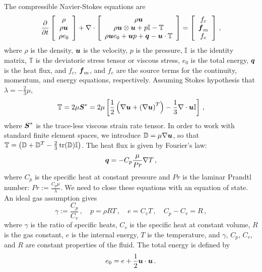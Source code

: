 \documentclass[Dissertation.tex]{subfiles}
\begin{document}
The compressible Navier-Stokes equations are
\begin{align}
\frac{\partial}{\partial t}\left[ \begin{array}{c} \rho\\ \rho\boldsymbol u\\ \rho e_0\\ \end{array} \right]
+\nabla\cdot\left[ \begin{array}{c} \rho\boldsymbol u\\ \rho\boldsymbol u\otimes\boldsymbol u+p\mathbb{I}-\mathbb{T}\\ \rho\boldsymbol u e_0+\boldsymbol u p+\boldsymbol q-\boldsymbol u\cdot\mathbb{T}\\ \end{array} \right]
=\left[ \begin{array}{c} f_c\\ \boldsymbol f_m\\ f_e\\ \end{array} \right]\,,
\end{align}
where $\rho$ is the density, $\boldsymbol u$ is the velocity, $p$ is the pressure, $\mathbb{I}$ is the identity matrix,
$\mathbb{T}$ is the deviatoric stress tensor or viscous stress, $e_0$ is the total energy, $\boldsymbol q$ is the heat flux, 
and $f_c$, $\boldsymbol f_m$, and $f_e$ are the source terms for the continuity, momentum, and energy equations, respectively.
Assuming Stokes hypothesis that $\lambda=-\frac{2}{3}\mu$, 
\begin{equation*}
	\mathbb{T}=2\mu\boldsymbol S^*=2\mu\left[ \frac{1}{2}\left( \nabla\boldsymbol u+\left( \nabla\boldsymbol u \right)^T \right)-\frac{1}{3}\nabla\cdot\boldsymbol u\mathbb{I} \right]\,,
\end{equation*}
where $\boldsymbol S^*$ is the trace-less viscous strain rate tensor.
In order to work with standard finite element spaces, we introduce $\mathbb{D}=\mu\nabla\boldsymbol u$, so that 
$\mathbb{T}=\left( \mathbb{D}+\mathbb{D}^T-\frac{2}{3}\operatorname*{tr}(\mathbb{D})\mathbb{I} \right)$.
The heat flux is given by Fourier's law:
\begin{equation*}
	\boldsymbol q=-C_p\frac{\mu}{Pr}\nabla T\,,
\end{equation*}
where $C_p$ is the specific heat at constant pressure and $Pr$ is the laminar Prandtl number: $Pr:=\frac{C_p\mu}{\lambda}$.
We need to close these equations with an equation of state. An ideal gas assumption gives
\begin{equation*}
	\gamma:=\frac{C_p}{C_v}\,,\quad p=\rho RT\,,\quad e=C_v T\,,\quad C_p-C_v=R\,,
\end{equation*}
where $\gamma$ is the ratio of specific heats, $C_v$ is the specific heat at constant volume, $R$ is the gas constant,
$e$ is the internal energy, $T$ is the temperature,
and $\gamma$, $C_p$, $C_v$, and $R$ are constant properties of the fluid.
The total energy is defined by
\begin{equation*}
	e_0=e+\frac{1}{2}\boldsymbol u\cdot\boldsymbol u\,.
\end{equation*}
\end{document}

